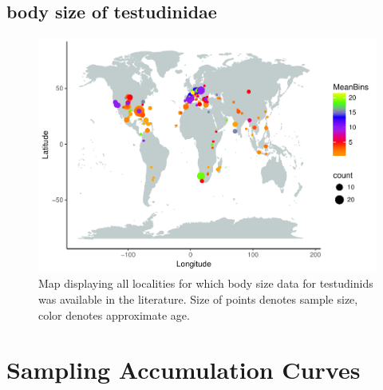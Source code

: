 \documentclass[]{article}
\begin{document}
\newpage

\subsection{body size of testudinidae}\label{body-size-of-testudinidae}

\begin{figure}[htbp]
\centering
\includegraphics{MA_JJ_files/figure-latex/Map body size data set-1.pdf}
\caption{Map displaying all localities for which body size data for
testudinids was available in the literature. Size of points denotes
sample size, color denotes approximate age.}
\end{figure}

\newpage

\section{Sampling Accumulation
Curves}\label{sampling-accumulation-curves}
\end{document}
